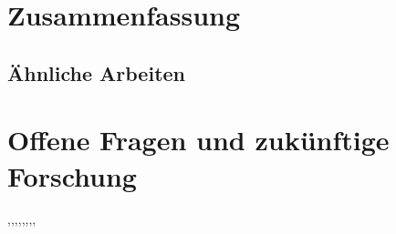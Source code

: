 \section{Zusammenfassung}

\subsection{Ähnliche Arbeiten}

\section{Offene Fragen und zukünftige Forschung}
\cite{res},\cite{n-3},\cite{OnDet},\cite{Bounds},\cite{Discrep},\cite{Cartesian},\cite{upper},\cite{landmarks}, \cite{Erdos}
\pagebreak

